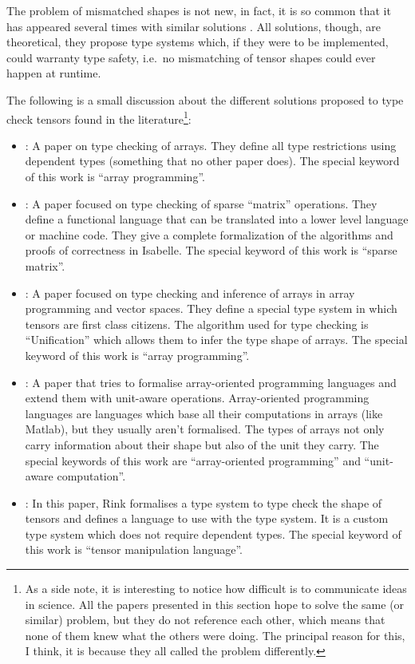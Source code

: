 The problem of mismatched shapes is not new, in fact, it is so common
that it has appeared several times with similar solutions
\autocites{arnold_specifying_2010}{griffioen_type_2015}{rink_modeling_2018}{slepak_array-oriented_2014}{trojahner_dependently_2009}.
All solutions, though, are theoretical, they propose type systems which,
if they were to be implemented, could warranty type safety, i.e.~no
mismatching of tensor shapes could ever happen at runtime.

The following is a small discussion about the different solutions
proposed to type check tensors found in the literature\footnote{As a
  side note, it is interesting to notice how difficult is to communicate
  ideas in science. All the papers presented in this section hope to
  solve the same (or similar) problem, but they do not reference each
  other, which means that none of them knew what the others were doing.
  The principal reason for this, I think, it is because they all called
  the problem differently.}:

\begin{itemize}
\item
  \textcite{trojahner_dependently_2009}: A paper on type checking of
  arrays. They define all type restrictions using dependent types
  (something that no other paper does). The special keyword of this work
  is \enquote{array programming}.
\item
  \textcite{arnold_specifying_2010}: A paper focused on type checking of
  sparse \enquote{matrix} operations. They define a functional language
  that can be translated into a lower level language or machine code.
  They give a complete formalization of the algorithms and proofs of
  correctness in Isabelle. The special keyword of this work is
  \enquote{sparse matrix}.
\item
  \textcite{griffioen_type_2015}: A paper focused on type checking and
  inference of arrays in array programming and vector spaces. They
  define a special type system in which tensors are first class
  citizens. The algorithm used for type checking is
  \enquote{Unification} which allows them to infer the type shape of
  arrays. The special keyword of this work is \enquote{array
  programming}.
\item
  \textcite{slepak_array-oriented_2014}: A paper that tries to formalise
  array-oriented programming languages and extend them with unit-aware
  operations. Array-oriented programming languages are languages which
  base all their computations in arrays (like Matlab), but they usually
  aren't formalised. The types of arrays not only carry information
  about their shape but also of the unit they carry. The special
  keywords of this work are \enquote{array-oriented programming} and
  \enquote{unit-aware computation}.
\item
  \textcite{rink_modeling_2018}: In this paper, Rink formalises a type
  system to type check the shape of tensors and defines a language to
  use with the type system. It is a custom type system which does not
  require dependent types. The special keyword of this work is
  \enquote{tensor manipulation language}.
\end{itemize}
